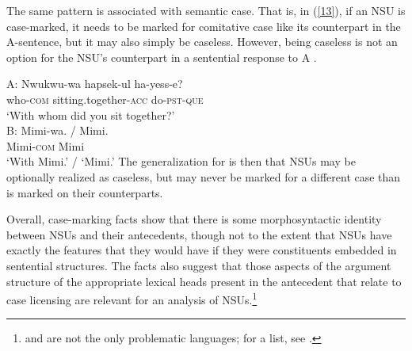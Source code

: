 The same pattern is associated with semantic case. That is, in (\ref{13}), if an NSU is case-marked, it needs
to be marked for comitative case like its counterpart in the A-sentence, but it may also simply be caseless. However,  
being caseless is not an option for the NSU's counterpart in a sentential response to A \citep{Kim2015}.

\ea
A:
\gll Nwukwu-wa          hapsek-ul                     ha-yess-e?\\
     who-\textsc{com}   sitting.together-\textsc{acc} do-\textsc{pst}-\textsc{que}\\
\glt  `With whom did you sit together?'\\

B:
\gll Mimi-wa. 			/ Mimi.\\
     Mimi-\textsc{com} {} Mimi\\
\glt `With Mimi.' / `Mimi.' \label{13}\z
%
The generalization for  is then that NSUs may be optionally realized as caseless, but may never be marked for a different case than is marked on their counterparts.

Overall, case-marking facts show that there is some morphosyntactic identity between NSUs and their antecedents, though not to the extent that NSUs have exactly the features that they would have if they were constituents embedded in sentential structures. The  facts also suggest that those aspects of the argument structure of the appropriate lexical heads present in the antecedent that relate to case licensing are relevant for an analysis of NSUs.\footnote{ and  are not the only problematic languages; for a list, see \citet{Vicente2015}.}

